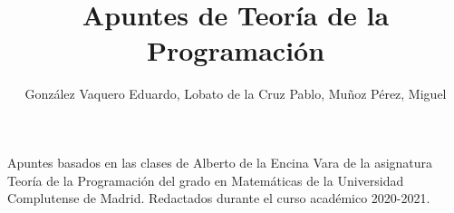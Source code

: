 \documentclass{book}
\author{González Vaquero Eduardo, Lobato de la Cruz Pablo, Muñoz Pérez, Miguel}
\theoremstyle{definition}
\theoremstyle{remark}
\theoremstyle{jeje}
\numberwithin{section}{chapter}
\numberwithin{equation}{chapter}
\begin{document}
\title{Apuntes de Teoría de la Programación}


\author{}

\maketitle




\cleardoublepage
\vspace*{13.5pc}
\begin{center}
  Apuntes basados en las clases de Alberto de la Encina Vara de la asignatura Teoría de la Programación del grado en Matemáticas de la Universidad Complutense de Madrid. Redactados durante el curso académico 2020-2021.\\
\end{center}
\cleardoublepage

\renewcommand{\contentsname}{Contenidos}
\tableofcontents
{}












\appendix


%
\end{document}
